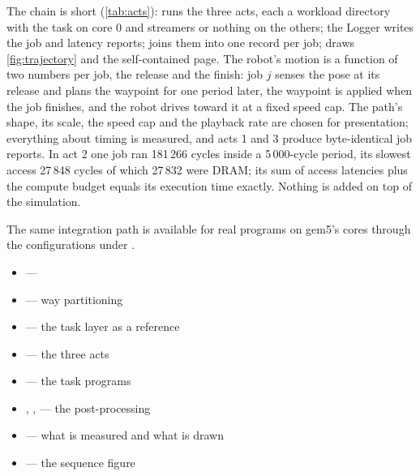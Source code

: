 
The chain is short (\cref{tab:acts}):  runs the three acts, each a
workload directory with the task on core 0 and streamers or nothing on the others; the Logger
writes the job and latency reports;  joins them into one record per
job;  draws \cref{fig:trajectory} and  the
self-contained page. The robot's motion is a function of two numbers per job, the release and
the finish: job $j$ senses the pose at its release and plans the waypoint for one period later,
the waypoint is applied when the job finishes, and the robot drives toward it at a fixed speed
cap. The path's shape, its scale, the speed cap and the playback rate are chosen for
presentation; everything about timing is measured, and acts 1 and 3 produce byte-identical job
reports. In act 2 one job ran 181\,266 cycles inside a 5\,000-cycle period, its slowest access
27\,848 cycles of which 27\,832 were DRAM; its sum of access latencies plus the compute budget
equals its execution time exactly. Nothing is added on top of the simulation.

The same integration path is available for real programs on gem5's cores through the
configurations under .

\begin{wherebox}
\begin{itemize}[nosep,leftmargin=1.2em]
\item {} --- 
\item {} --- way partitioning
\item {} --- the task layer as a reference
\item {} --- the three acts
\item {} --- the task programs
\item {}, ,  --- the post-processing
\item {} --- what is measured and what is drawn
\item {} --- the sequence figure
\end{itemize}
\end{wherebox}
